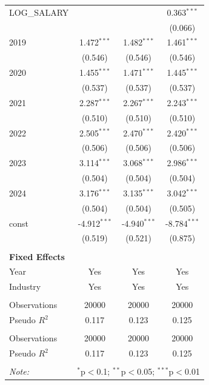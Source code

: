 \begin{table}[!htbp]
\begin{tabular}{@{\extracolsep{5pt}}lccc}
 LOG_SALARY & & & 0.363$^{***}$ \\
& & & (0.066) \\
 2019 & 1.472$^{***}$ & 1.482$^{***}$ & 1.461$^{***}$ \\
& (0.546) & (0.546) & (0.546) \\
 2020 & 1.455$^{***}$ & 1.471$^{***}$ & 1.445$^{***}$ \\
& (0.537) & (0.537) & (0.537) \\
 2021 & 2.287$^{***}$ & 2.267$^{***}$ & 2.243$^{***}$ \\
& (0.510) & (0.510) & (0.510) \\
 2022 & 2.505$^{***}$ & 2.470$^{***}$ & 2.420$^{***}$ \\
& (0.506) & (0.506) & (0.506) \\
 2023 & 3.114$^{***}$ & 3.068$^{***}$ & 2.986$^{***}$ \\
& (0.504) & (0.504) & (0.504) \\
 2024 & 3.176$^{***}$ & 3.135$^{***}$ & 3.042$^{***}$ \\
& (0.504) & (0.504) & (0.505) \\
 const & -4.912$^{***}$ & -4.940$^{***}$ & -8.784$^{***}$ \\
& (0.519) & (0.521) & (0.875) \\
 \hline &  &  &  \\
 \textbf{Fixed Effects} &  &  &  \\
 \quad Year & Yes & Yes & Yes \\
 \quad Industry & Yes & Yes & Yes \\
 \hline &  &  &  \\
 Observations & 20000 & 20000 & 20000 \\
 Pseudo $R^2$ & 0.117 & 0.123 & 0.125 \\
\hline \\[-1.8ex]
 Observations & 20000 & 20000 & 20000 \\
 Pseudo $R^2$ & 0.117 & 0.123 & 0.125 \\
\hline
\hline \\[-1.8ex]
\textit{Note:} & \multicolumn{3}{r}{$^{*}$p$<$0.1; $^{**}$p$<$0.05; $^{***}$p$<$0.01} \\
\end{tabular}
\end{table}